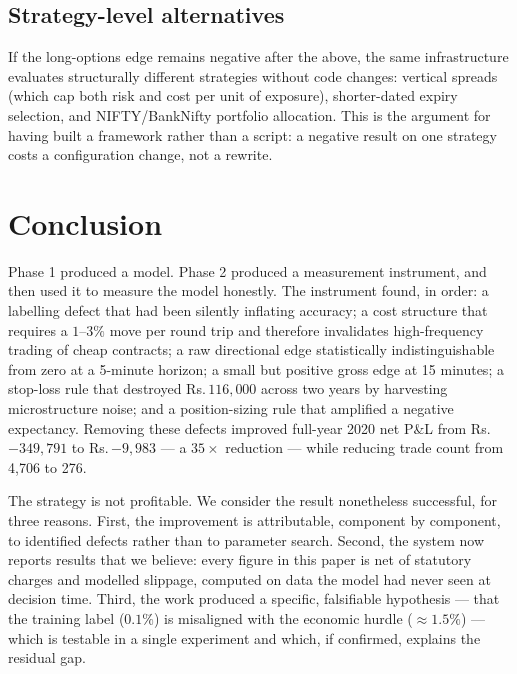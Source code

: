 \documentclass[11pt,a4paper]{article}
\newcommand{\rs}{Rs.\,}                 %
\begin{document}
\subsection{Strategy-level alternatives}

If the long-options edge remains negative after the above, the same infrastructure
evaluates structurally different strategies without code changes: vertical spreads (which
cap both risk and cost per unit of exposure), shorter-dated expiry selection, and
NIFTY/BankNifty portfolio allocation. This is the argument for having built a framework
rather than a script: a negative result on one strategy costs a configuration change, not
a rewrite.

\section{Conclusion}

Phase 1 produced a model. Phase 2 produced a measurement instrument, and then used it to
measure the model honestly. The instrument found, in order: a labelling defect that had
been silently inflating accuracy; a cost structure that requires a $1$--$3\%$ move per
round trip and therefore invalidates high-frequency trading of cheap contracts; a raw
directional edge statistically indistinguishable from zero at a 5-minute horizon; a small
but positive gross edge at 15 minutes; a stop-loss rule that destroyed \rs$116{,}000$
across two years by harvesting microstructure noise; and a position-sizing rule that
amplified a negative expectancy. Removing these defects improved full-year 2020 net P\&L
from \rs$-349{,}791$ to \rs$-9{,}983$ --- a $35\times$ reduction --- while reducing
trade count from 4{,}706 to 276.

The strategy is not profitable. We consider the result nonetheless successful, for three
reasons. First, the improvement is attributable, component by component, to identified
defects rather than to parameter search. Second, the system now reports results that we
believe: every figure in this paper is net of statutory charges and modelled slippage,
computed on data the model had never seen at decision time. Third, the work produced a
specific, falsifiable hypothesis --- that the training label ($0.1\%$) is misaligned with
the economic hurdle ($\approx 1.5\%$) --- which is testable in a single experiment and
which, if confirmed, explains the residual gap.
\end{document}
